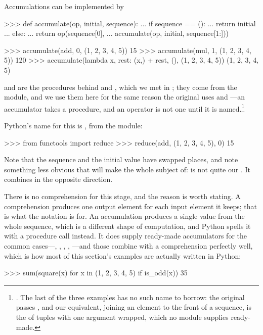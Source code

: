 \noindent
Accumulations can be implemented by

\begin{codeBlock}
>>> def accumulate(op, initial, sequence):
...     if sequence == ():
...         return initial
...     else:
...         return op(sequence[0],
...                   accumulate(op, initial, sequence[1:]))

>>> accumulate(add, 0, (1, 2, 3, 4, 5))
15
>>> accumulate(mul, 1, (1, 2, 3, 4, 5))
120
>>> accumulate(lambda x, rest: (x,) + rest, (), (1, 2, 3, 4, 5))
(1, 2, 3, 4, 5)
\end{codeBlock}

\noindent
{} and  are the procedures behind \code{+} and \code{*},
which we met in ; they come from the  module,
and we use them here for the same reason the original uses \code{+} and
\code{*}---an accumulator takes a procedure, and an operator is not one until
it is named.\footnote{.  The last of the
three examples has no such name to borrow: the original passes ,
and our equivalent, joining an element to the front of a sequence, is the
\code{+} of tuples with one argument wrapped, which no module supplies
ready-made.}

\begin{revealTheSurface}
Python's name for this is , from the  module:

\begin{codeBlock}
>>> from functools import reduce
>>> reduce(add, (1, 2, 3, 4, 5), 0)
15
\end{codeBlock}

\noindent
Note that the sequence and the initial value have swapped places, and note
something less obvious that  will make the whole subject
of:  is not quite our .  It combines in the
opposite direction.

There is no comprehension for this stage, and the reason is worth stating.  A
comprehension produces one output element for each input element it keeps; that
is what the notation is for.  An accumulation produces a single value from the
whole sequence, which is a different shape of computation, and Python spells it
with a procedure call instead.  It does supply ready-made accumulators for the
common cases---, , , , ---and
those combine with a comprehension perfectly well, which is how most of this
section's examples are actually written in Python:

\begin{codeBlock}
>>> sum(square(x) for x in (1, 2, 3, 4, 5) if is_odd(x))
35
\end{codeBlock}
\end{revealTheSurface}

